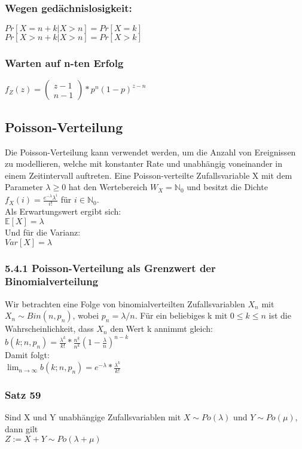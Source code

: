 \documentclass[11pt]{article}
\begin{document}
{\subsubsection{Wegen gedächnislosigkeit:}
\label{sec:orgb584a09}
\(Pr[X = n+k | X > n] = Pr[X=k]\) \\
\(Pr[X > n+k | X > n] = Pr[X>k]\)
\subsubsection{Warten auf n-ten Erfolg}
\label{sec:org20b21c2}
\(f_Z(z) = \begin{pmatrix} z - 1 \\ n - 1 \end{pmatrix} * p^n (1-p)^{z-n}\)
\subsection{Poisson-Verteilung}
\label{sec:orgc37e428}
Die Poisson-Verteilung kann verwendet werden, um die Anzahl von Ereignissen zu
modellieren, welche mit konstanter Rate und unabhängig voneinander in einem
Zeitintervall auftreten.
Eine Poisson-verteilte Zufallsvariable X mit dem Parameter \(\lambda \geq 0\) hat den
Wertebereich \(W_X = \mathbb{N}_0\) und besitzt die Dichte
\(f_X(i) = \frac{e^{-\lambda}\lambda^i}{i!}\) für \(i \in \mathbb{N}_0\). \\
Als Erwartungswert ergibt sich: \\
\(\mathbb{E}[X] = \lambda\) \\
Und für die Varianz: \\
\(Var[X] = \lambda\)
\subsubsection{5.4.1 Poisson-Verteilung als Grenzwert der Binomialverteilung}
\label{sec:orgd13f315}
Wir betrachten eine Folge von binomialverteilten Zufallsvariablen \(X_n\) mit
\(X_n \sim Bin(n, p_n)\), wobei \(p_n = \lambda/n\). Für ein beliebiges k mit \(0 \leq k \leq n\) ist die Wahrscheinlichkeit, dass \(X_n\) den Wert k annimmt gleich: \\
\(b(k;n,p_n) = \frac{\lambda^k}{k!} * \frac{n^{\underline{k}}}{n^k} (1-\frac{\lambda}{n})^{n-k}\) \\
Damit folgt: \\
\(\lim_{n \rightarrow \infty} b(k;n,p_n) = e^{-\lambda} * \frac{\lambda^k}{k!}\)

\subsubsection{Satz 59}
\label{sec:org7f73420}
Sind X und Y unabhängige Zufallsvariablen mit \(X \sim Po(\lambda)\) und \(Y \sim Po(\mu)\), dann gilt \\
\(Z := X + Y  \sim Po(\lambda + \mu)\)

}
\end{document}
